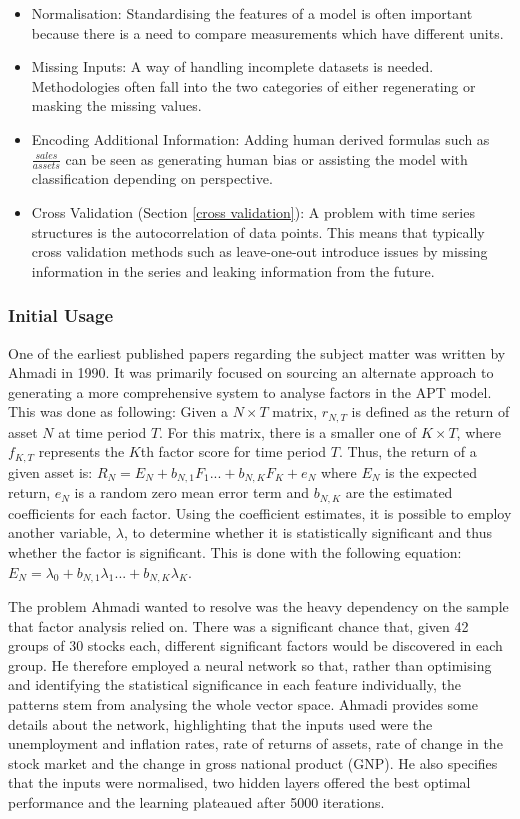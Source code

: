 \documentclass[10pt,onecolumn,letterpaper]{article}
\begin{document}
\begin{itemize}
	\item Normalisation: Standardising the features of a model is often important because there is a need to compare measurements which have different units. 
	\item Missing Inputs: A way of handling incomplete datasets is needed. Methodologies often fall into the two categories of either regenerating or masking the missing values. 
	\item Encoding Additional Information: Adding human derived formulas such as $\frac{sales}{assets}$ can be seen as generating human bias or assisting the model with classification depending on perspective. 
	\item Cross Validation (Section \ref{cross validation}): A problem with time series structures is the autocorrelation of data points. This means that typically cross validation methods such as leave-one-out introduce issues by missing information in the series and leaking information from the future. 
\end{itemize}

\subsubsection{Initial Usage}

One of the earliest published papers\cite{Ahmadi} regarding the subject matter was written by Ahmadi in 1990. It was primarily focused on sourcing an alternate approach to generating a more comprehensive system to analyse factors in the APT model. This was done as following: Given a $N\times T$ matrix, $r_{N,T}$ is defined as the return of asset $N$ at time period $T$. For this matrix, there is a smaller one of $K\times T$, where $f_{K,T}$ represents the $K$th factor score for time period $T$. Thus, the return of a given asset is: 
$R_{N} = E_{N} + b_{N,1}F_{1} ... + b_{N,K}F_{K} + e_{N}$ where $E_{N}$ is the expected return, $e_{N}$ is a random zero mean error term and  $b_{N,K}$ are the estimated coefficients for each factor. Using the coefficient estimates, it is possible to employ another variable, $\lambda$, to determine whether it is statistically significant and thus whether the factor is significant. This is done with the following equation: $E_{N} = \lambda_{0} + b_{N,1}\lambda_{1} ... + b_{N,K}\lambda_{K}$.

The problem Ahmadi wanted to resolve was the heavy dependency on the sample that factor analysis relied on. There was a significant chance that, given 42 groups of 30 stocks each, different significant factors would be discovered in each group. He therefore employed a neural network so that, rather than optimising and identifying the statistical significance in each feature individually, the patterns stem from analysing the whole vector space. Ahmadi provides some details about the network, highlighting that the inputs used were the unemployment and inflation rates, rate of returns of assets, rate of change in the stock market and the change in gross national product (GNP). He also specifies that the inputs were normalised, two hidden layers offered the best optimal performance and the learning plateaued after 5000 iterations. 
\end{document}
